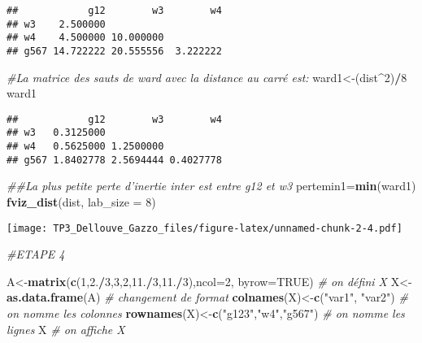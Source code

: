 \documentclass[
]{article}
\newenvironment{Shaded}{\begin{snugshade}}{\end{snugshade}}
\newcommand{\CommentTok}[1]{\textcolor[rgb]{0.56,0.35,0.01}{\textit{#1}}}
\newcommand{\DataTypeTok}[1]{\textcolor[rgb]{0.13,0.29,0.53}{#1}}
\newcommand{\DecValTok}[1]{\textcolor[rgb]{0.00,0.00,0.81}{#1}}
\newcommand{\FloatTok}[1]{\textcolor[rgb]{0.00,0.00,0.81}{#1}}
\newcommand{\KeywordTok}[1]{\textcolor[rgb]{0.13,0.29,0.53}{\textbf{#1}}}
\newcommand{\NormalTok}[1]{#1}
\newcommand{\OperatorTok}[1]{\textcolor[rgb]{0.81,0.36,0.00}{\textbf{#1}}}
\newcommand{\OtherTok}[1]{\textcolor[rgb]{0.56,0.35,0.01}{#1}}
\newcommand{\StringTok}[1]{\textcolor[rgb]{0.31,0.60,0.02}{#1}}
\begin{document}
\begin{verbatim}
##            g12        w3        w4
## w3    2.500000                    
## w4    4.500000 10.000000          
## g567 14.722222 20.555556  3.222222
\end{verbatim}

\begin{Shaded}
\begin{Highlighting}[]
\CommentTok{#La matrice des sauts de ward avec la distance au carré est:}
\NormalTok{ward1<-(dist}\OperatorTok{^}\DecValTok{2}\NormalTok{)}\OperatorTok{/}\DecValTok{8}
\NormalTok{ward1}
\end{Highlighting}
\end{Shaded}

\begin{verbatim}
##            g12        w3        w4
## w3   0.3125000                    
## w4   0.5625000 1.2500000          
## g567 1.8402778 2.5694444 0.4027778
\end{verbatim}

\begin{Shaded}
\begin{Highlighting}[]
\CommentTok{##La plus petite perte d'inertie inter est entre g12 et w3}
\NormalTok{pertemin1=}\KeywordTok{min}\NormalTok{(ward1)}
\KeywordTok{fviz_dist}\NormalTok{(dist, }\DataTypeTok{lab_size =} \DecValTok{8}\NormalTok{)}
\end{Highlighting}
\end{Shaded}

\texttt{[image: TP3\_Dellouve\_Gazzo\_files/figure-latex/unnamed-chunk-2-4.pdf]}

\begin{Shaded}
\begin{Highlighting}[]
\CommentTok{#ETAPE 4}

\NormalTok{A<-}\KeywordTok{matrix}\NormalTok{(}\KeywordTok{c}\NormalTok{(}\DecValTok{1}\NormalTok{,}\FloatTok{2.}\OperatorTok{/}\DecValTok{3}\NormalTok{,}\DecValTok{3}\NormalTok{,}\DecValTok{2}\NormalTok{,}\FloatTok{11.}\OperatorTok{/}\DecValTok{3}\NormalTok{,}\FloatTok{11.}\OperatorTok{/}\DecValTok{3}\NormalTok{),}\DataTypeTok{ncol=}\DecValTok{2}\NormalTok{, }\DataTypeTok{byrow=}\OtherTok{TRUE}\NormalTok{) }\CommentTok{# on défini X}
\NormalTok{X<-}\KeywordTok{as.data.frame}\NormalTok{(A) }\CommentTok{# changement de format}
\KeywordTok{colnames}\NormalTok{(X)<-}\KeywordTok{c}\NormalTok{(}\StringTok{"var1"}\NormalTok{, }\StringTok{"var2"}\NormalTok{) }\CommentTok{# on nomme les colonnes}
\KeywordTok{rownames}\NormalTok{(X)<-}\KeywordTok{c}\NormalTok{(}\StringTok{"g123"}\NormalTok{,}\StringTok{"w4"}\NormalTok{,}\StringTok{"g567"}\NormalTok{) }\CommentTok{# on nomme les lignes}
\NormalTok{X }\CommentTok{# on affiche X}
\end{Highlighting}
\end{Shaded}
\end{document}
